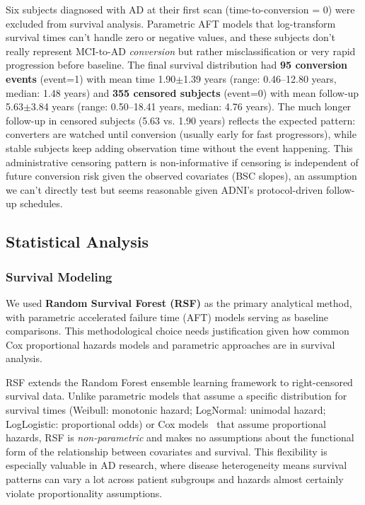 \documentclass[blue]{ludusofficial}  %
\begin{document}
Six subjects diagnosed with AD at their first scan (time-to-conversion = 0) were excluded from survival analysis. Parametric AFT models that log-transform survival times can't handle zero or negative values, and these subjects don't really represent MCI-to-AD \textit{conversion} but rather misclassification or very rapid progression before baseline. The final survival distribution had \textbf{95 conversion events} (event=1) with mean time 1.90$\pm$1.39 years (range: 0.46--12.80 years, median: 1.48 years) and \textbf{355 censored subjects} (event=0) with mean follow-up 5.63$\pm$3.84 years (range: 0.50--18.41 years, median: 4.76 years). The much longer follow-up in censored subjects (5.63 vs. 1.90 years) reflects the expected pattern: converters are watched until conversion (usually early for fast progressors), while stable subjects keep adding observation time without the event happening. This administrative censoring pattern is non-informative if censoring is independent of future conversion risk given the observed covariates (BSC slopes), an assumption we can't directly test but seems reasonable given ADNI's protocol-driven follow-up schedules.

\subsection{Statistical Analysis}

\subsubsection{Survival Modeling}

We used \textbf{Random Survival Forest (RSF)} as the primary analytical method, with parametric accelerated failure time (AFT) models serving as baseline comparisons. This methodological choice needs justification given how common Cox proportional hazards models and parametric approaches are in survival analysis.

RSF extends the Random Forest ensemble learning framework to right-censored survival data. Unlike parametric models that assume a specific distribution for survival times (Weibull: monotonic hazard; LogNormal: unimodal hazard; LogLogistic: proportional odds) or Cox models~\cite{cox1972} that assume proportional hazards, RSF is \textit{non-parametric} and makes no assumptions about the functional form of the relationship between covariates and survival. This flexibility is especially valuable in AD research, where disease heterogeneity means survival patterns can vary a lot across patient subgroups and hazards almost certainly violate proportionality assumptions.
\end{document}
